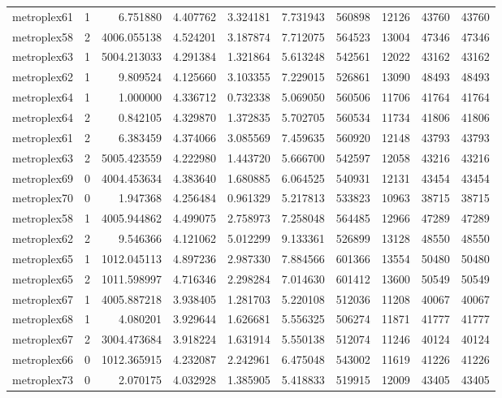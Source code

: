 \documentclass[../../../thesis.tex]{subfiles}
\begin{document}
\begin{longtable}{|l|r|r|r|r|r|r|r|r|r|}
metroplex61 & 1 & 6.751880 & 4.407762 & 3.324181 & 7.731943 & 560898 & 12126 & 43760 & 43760 \\
metroplex58 & 2 & 4006.055138 & 4.524201 & 3.187874 & 7.712075 & 564523 & 13004 & 47346 & 47346 \\
metroplex63 & 1 & 5004.213033 & 4.291384 & 1.321864 & 5.613248 & 542561 & 12022 & 43162 & 43162 \\
metroplex62 & 1 & 9.809524 & 4.125660 & 3.103355 & 7.229015 & 526861 & 13090 & 48493 & 48493 \\
metroplex64 & 1 & 1.000000 & 4.336712 & 0.732338 & 5.069050 & 560506 & 11706 & 41764 & 41764 \\
metroplex64 & 2 & 0.842105 & 4.329870 & 1.372835 & 5.702705 & 560534 & 11734 & 41806 & 41806 \\
metroplex61 & 2 & 6.383459 & 4.374066 & 3.085569 & 7.459635 & 560920 & 12148 & 43793 & 43793 \\
metroplex63 & 2 & 5005.423559 & 4.222980 & 1.443720 & 5.666700 & 542597 & 12058 & 43216 & 43216 \\
metroplex69 & 0 & 4004.453634 & 4.383640 & 1.680885 & 6.064525 & 540931 & 12131 & 43454 & 43454 \\
metroplex70 & 0 & 1.947368 & 4.256484 & 0.961329 & 5.217813 & 533823 & 10963 & 38715 & 38715 \\
metroplex58 & 1 & 4005.944862 & 4.499075 & 2.758973 & 7.258048 & 564485 & 12966 & 47289 & 47289 \\
metroplex62 & 2 & 9.546366 & 4.121062 & 5.012299 & 9.133361 & 526899 & 13128 & 48550 & 48550 \\
metroplex65 & 1 & 1012.045113 & 4.897236 & 2.987330 & 7.884566 & 601366 & 13554 & 50480 & 50480 \\
metroplex65 & 2 & 1011.598997 & 4.716346 & 2.298284 & 7.014630 & 601412 & 13600 & 50549 & 50549 \\
metroplex67 & 1 & 4005.887218 & 3.938405 & 1.281703 & 5.220108 & 512036 & 11208 & 40067 & 40067 \\
metroplex68 & 1 & 4.080201 & 3.929644 & 1.626681 & 5.556325 & 506274 & 11871 & 41777 & 41777 \\
metroplex67 & 2 & 3004.473684 & 3.918224 & 1.631914 & 5.550138 & 512074 & 11246 & 40124 & 40124 \\
metroplex66 & 0 & 1012.365915 & 4.232087 & 2.242961 & 6.475048 & 543002 & 11619 & 41226 & 41226 \\
metroplex73 & 0 & 2.070175 & 4.032928 & 1.385905 & 5.418833 & 519915 & 12009 & 43405 & 43405 \\

\end{longtable}
\end{document}
